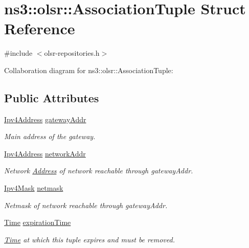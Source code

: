 \hypertarget{structns3_1_1olsr_1_1AssociationTuple}{}\section{ns3\+:\+:olsr\+:\+:Association\+Tuple Struct Reference}
\label{structns3_1_1olsr_1_1AssociationTuple}


{\ttfamily \#include $<$olsr-\/repositories.\+h$>$}



Collaboration diagram for ns3\+:\+:olsr\+:\+:Association\+Tuple\+:
\subsection*{Public Attributes}
\begin{DoxyCompactItemize}
\item 
\hyperlink{classns3_1_1Ipv4Address}{Ipv4\+Address} \hyperlink{structns3_1_1olsr_1_1AssociationTuple_ac4ff331773f72df266b29f5474f48c3c}{gateway\+Addr}
\begin{DoxyCompactList}\small\item\em Main address of the gateway. \end{DoxyCompactList}\item 
\hyperlink{classns3_1_1Ipv4Address}{Ipv4\+Address} \hyperlink{structns3_1_1olsr_1_1AssociationTuple_a09d79f6792b7c7943a25f2da13ae4c59}{network\+Addr}
\begin{DoxyCompactList}\small\item\em Network \hyperlink{classns3_1_1Address}{Address} of network reachable through gateway\+Addr. \end{DoxyCompactList}\item 
\hyperlink{classns3_1_1Ipv4Mask}{Ipv4\+Mask} \hyperlink{structns3_1_1olsr_1_1AssociationTuple_a513cb45c5fedf9fabbe015606f05bfcb}{netmask}
\begin{DoxyCompactList}\small\item\em Netmask of network reachable through gateway\+Addr. \end{DoxyCompactList}\item 
\hyperlink{classns3_1_1Time}{Time} \hyperlink{structns3_1_1olsr_1_1AssociationTuple_a9becaf0d713a9ed1db7834d0f3cdb864}{expiration\+Time}
\begin{DoxyCompactList}\small\item\em \hyperlink{classns3_1_1Time}{Time} at which this tuple expires and must be removed. \end{DoxyCompactList}\end{DoxyCompactItemize}


